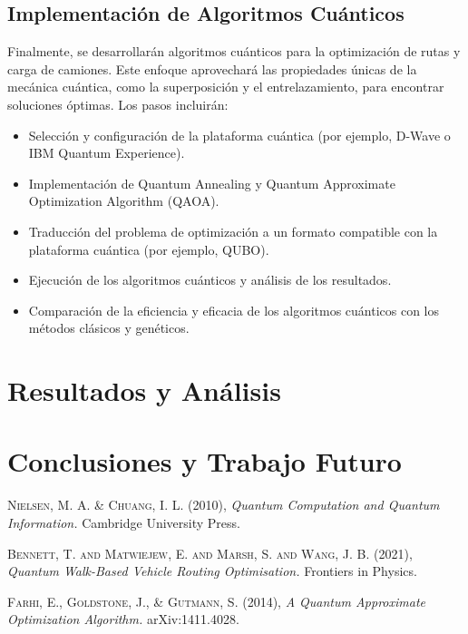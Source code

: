 \documentclass[11pt,a4paper,spanish]{book}
\begin{document}
\begin{itemize}
\section{Implementación de Algoritmos Cuánticos}

Finalmente, se desarrollarán algoritmos cuánticos para la optimización de rutas y carga de camiones. Este enfoque aprovechará las propiedades únicas de la mecánica cuántica, como la superposición y el entrelazamiento, para encontrar soluciones óptimas. Los pasos incluirán:

\begin{itemize}
	\item Selección y configuración de la plataforma cuántica (por ejemplo, D-Wave o IBM Quantum Experience).
	\item Implementación de Quantum Annealing y Quantum Approximate Optimization Algorithm (QAOA).
	\item Traducción del problema de optimización a un formato compatible con la plataforma cuántica (por ejemplo, QUBO).
	\item Ejecución de los algoritmos cuánticos y análisis de los resultados.
	\item Comparación de la eficiencia y eficacia de los algoritmos cuánticos con los métodos clásicos y genéticos.
\end{itemize}

\chapter{Resultados y Análisis}

\chapter{Conclusiones y Trabajo Futuro}

\begin{thebibliography}{a}

	 \textsc{Nielsen, M. A. \& Chuang, I. L.} (2010),
	\textit{Quantum Computation and Quantum Information.}
	Cambridge University Press.
	
	 \textsc{Bennett, T. and Matwiejew, E. and Marsh, S. and Wang, J. B.} (2021),
	\textit{Quantum Walk-Based Vehicle Routing Optimisation.}
	Frontiers in Physics.
	
	 \textsc{Farhi, E., Goldstone, J., \& Gutmann, S.} (2014),
	\textit{A Quantum Approximate Optimization Algorithm.}
	arXiv:1411.4028.
	

\end{thebibliography}
\end{itemize}
\end{document}

